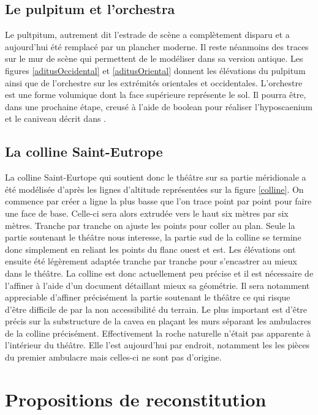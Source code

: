 		\section{Le pulpitum et l'orchestra} 

Le pultpitum, autrement dit l'estrade de scène a complètement disparu et a aujourd'hui été remplacé par un plancher moderne. Il reste néanmoins des traces sur le mur de scène qui permettent de le modéliser dans sa version antique. Les figures \ref{aditusOccidental} et \ref{aditusOriental} donnent les élévations du pulpitum ainsi que de l'orchestre sur les extrémités orientales et occidentales. L'orchestre est une forme volumique dont la face supérieure représente le sol. Il pourra être, dans une prochaine étape, creusé à l'aide de \gls{boolean} pour réaliser l'hyposcaenium et le caniveau décrit dans \cite[Chap. VI]{orangeTxt}.

		\section{La colline Saint-Eutrope} 
La colline Saint-Eurtope qui soutient donc le théâtre sur sa partie méridionale a été modélisée d'après les lignes d'altitude représentées sur la figure \ref{colline}. On commence par créer a ligne la plus basse que l'on trace point par point pour faire une face de base. Celle-ci sera alors extrudée vers le haut six mètres par six mètres. Tranche par tranche on ajuste les points pour coller au plan. Seule la partie soutenant le théâtre nous interesse, la partie sud de la colline se termine donc simplement en reliant les points du flanc ouest et est. Les élévations ont ensuite été légèrement adaptée tranche par tranche pour s'encastrer au mieux dans le théâtre. La colline est donc actuellement peu précise et il est nécessaire de l'affiner à l'aide d'un document détaillant mieux sa géométrie. Il sera notamment appreciable d'affiner précisément la partie soutenant le théâtre ce qui risque d'être difficile de par la non accessibilité du terrain. Le plus important est d'être précis sur la substructure de la cavea en plaçant les murs séparant les ambulacres de la colline précisément. Effectivement la roche naturelle n'était pas apparente à l'intérieur du théâtre. Elle l'est aujourd'hui par endroit, notamment les les pièces du premier ambulacre mais celles-ci ne sont pas d'origine.



		
\chapter{Propositions de reconstitution}
	\minitoc
	\newpage
		

